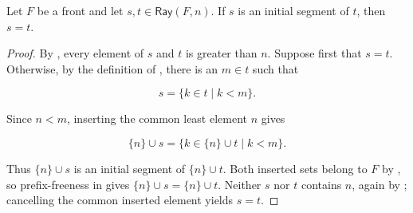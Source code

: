 \begin{helper}
Let $F$ be a front and let $s,t\in\mathsf{Ray}(F,n)$.  If $s$ is an
initial segment of $t$, then $s=t$.
\end{helper}
\begin{proof}
By , every element of $s$ and $t$ is greater than $n$.
Suppose first that $s=t$.  Otherwise, by the definition of
, there is an $m\in t$ such that

\[
s=\{k\in t\mid k<m\}.
\]

Since $n<m$, inserting the common least element $n$ gives

\[
\{n\}\cup s
 =\{k\in\{n\}\cup t\mid k<m\}.
\]

Thus $\{n\}\cup s$ is an initial segment of $\{n\}\cup t$.  Both
inserted sets belong to $F$ by , so prefix-freeness in
 gives $\{n\}\cup s=\{n\}\cup t$.  Neither $s$ nor $t$
contains $n$, again by ; cancelling the common inserted
element yields $s=t$.
\end{proof}
